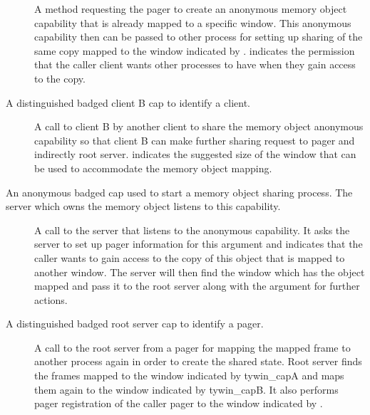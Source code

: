 \begin{description}
  \item
  \begin{description}
  \item[] A method
    requesting the pager to create an anonymous memory object
    capability that is already mapped to a specific window. This
    anonymous capability then can be passed to other process for
    setting up sharing of the same copy mapped to the window indicated
    by .  indicates the permission that the
    caller client wants other processes to have when they gain access
    to the copy.
  \end{description}

\item[\ty{clientB\_clientid\_cap}] A distinguished badged client B cap
  to identify a client.
  \begin{description}
  \item[] A call to
    client B by another client to share the memory object anonymous
    capability  so that client B can make
    further sharing request to pager and indirectly root
    server.  indicates the suggested size of the window
    that can be used to accommodate the memory object mapping.
  \end{description}

\item[\ty{mobject\_anon\_cap}] An anonymous badged cap used to start a
  memory object sharing process. The server which owns the memory
  object listens to this capability.
  \begin{description}
  \item[] A call to the server that
    listens to the anonymous capability. It asks the server to set up
    pager information for this argument  and indicates
    that the caller wants to gain access to the copy of this object
    that is mapped to another window. The server will then find the
    window which has the object mapped and pass it to the root server
    along with the argument  for further actions.
  \end{description}

\item[\ty{rootserver\_pagerid\_cap}] A distinguished badged root
  server cap to identify a pager.
  \begin{description}
  \item[] A call to the
    root server from a pager for mapping the mapped frame to another
    process again in order to create the shared state. Root server
    finds the frames mapped to the window indicated by ty{win\_capA}
    and maps them again to the window indicated by ty{win\_capB}. It
    also performs pager registration of the caller pager to the window
    indicated by .
  \end{description}


\end{description}
